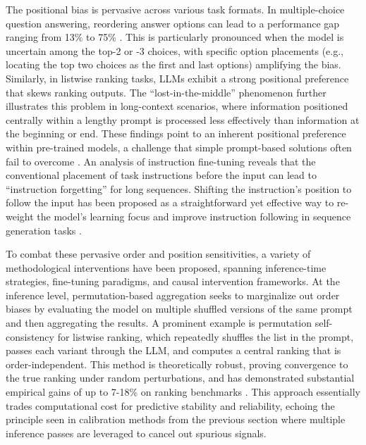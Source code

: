 \documentclass[11pt]{article}
\begin{document}
The positional bias is pervasive across various task formats. In multiple-choice question answering, reordering answer options can lead to a performance gap ranging from 13\% to 75\% \cite{ref182}. This is particularly pronounced when the model is uncertain among the top-2 or -3 choices, with specific option placements (e.g., locating the top two choices as the first and last options) amplifying the bias. Similarly, in listwise ranking tasks, LLMs exhibit a strong positional preference that skews ranking outputs. The ``lost-in-the-middle'' phenomenon further illustrates this problem in long-context scenarios, where information positioned centrally within a lengthy prompt is processed less effectively than information at the beginning or end. These findings point to an inherent positional preference within pre-trained models, a challenge that simple prompt-based solutions often fail to overcome \cite{ref183}. An analysis of instruction fine-tuning reveals that the conventional placement of task instructions before the input can lead to ``instruction forgetting'' for long sequences. Shifting the instruction's position to follow the input has been proposed as a straightforward yet effective way to re-weight the model's learning focus and improve instruction following in sequence generation tasks \cite{ref184}.

To combat these pervasive order and position sensitivities, a variety of methodological interventions have been proposed, spanning inference-time strategies, fine-tuning paradigms, and causal intervention frameworks. At the inference level, permutation-based aggregation seeks to marginalize out order biases by evaluating the model on multiple shuffled versions of the same prompt and then aggregating the results. A prominent example is permutation self-consistency for listwise ranking, which repeatedly shuffles the list in the prompt, passes each variant through the LLM, and computes a central ranking that is order-independent. This method is theoretically robust, proving convergence to the true ranking under random perturbations, and has demonstrated substantial empirical gains of up to 7-18\% on ranking benchmarks \cite{ref185}. This approach essentially trades computational cost for predictive stability and reliability, echoing the principle seen in calibration methods from the previous section where multiple inference passes are leveraged to cancel out spurious signals.
\end{document}
